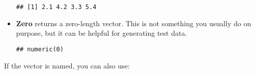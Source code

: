 \begin{itemize}
\begin{verbatim}
## [1] 2.1 4.2 3.3 5.4
\end{verbatim}
\item
  \textbf{Zero} returns a zero-length vector. This is not something you
  usually do on purpose, but it can be helpful for generating test data.

\begin{Shaded}
\begin{Highlighting}[]
\NormalTok{x[}\NormalTok{]}
\end{Highlighting}
\end{Shaded}

\begin{verbatim}
## numeric(0)
\end{verbatim}
\end{itemize}

If the vector is named, you can also use:

